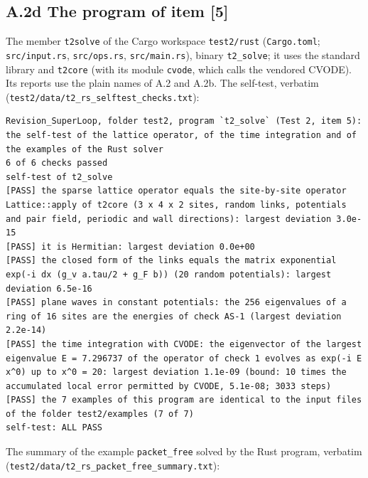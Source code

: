 \documentclass[
  10pt,
]{article}
\begin{document}
\hypertarget{a.2d-the-program-of-item-5}{%
\subsection{A.2d The program of item
{[}5{]}}\label{a.2d-the-program-of-item-5}}

The member \texttt{t2solve} of the Cargo workspace \texttt{test2/rust}
(\texttt{Cargo.toml}; \texttt{src/input.rs}, \texttt{src/ops.rs},
\texttt{src/main.rs}), binary \texttt{t2\_solve}; it uses the standard
library and \texttt{t2core} (with its module \texttt{cvode}, which calls
the vendored CVODE). Its reports use the plain names of A.2 and A.2b.
The self-test, verbatim
(\texttt{test2/data/t2\_rs\_selftest\_checks.txt}):

\begin{verbatim}
Revision_SuperLoop, folder test2, program `t2_solve` (Test 2, item 5): the self-test of the lattice operator, of the time integration and of the examples of the Rust solver
6 of 6 checks passed
self-test of t2_solve
[PASS] the sparse lattice operator equals the site-by-site operator Lattice::apply of t2core (3 x 4 x 2 sites, random links, potentials and pair field, periodic and wall directions): largest deviation 3.0e-15
[PASS] it is Hermitian: largest deviation 0.0e+00
[PASS] the closed form of the links equals the matrix exponential exp(-i dx (g_v a.tau/2 + g_F b)) (20 random potentials): largest deviation 6.5e-16
[PASS] plane waves in constant potentials: the 256 eigenvalues of a ring of 16 sites are the energies of check AS-1 (largest deviation 2.2e-14)
[PASS] the time integration with CVODE: the eigenvector of the largest eigenvalue E = 7.296737 of the operator of check 1 evolves as exp(-i E x^0) up to x^0 = 20: largest deviation 1.1e-09 (bound: 10 times the accumulated local error permitted by CVODE, 5.1e-08; 3033 steps)
[PASS] the 7 examples of this program are identical to the input files of the folder test2/examples (7 of 7)
self-test: ALL PASS
\end{verbatim}

The summary of the example \texttt{packet\_free} solved by the Rust
program, verbatim
(\texttt{test2/data/t2\_rs\_packet\_free\_summary.txt}):
\end{document}
